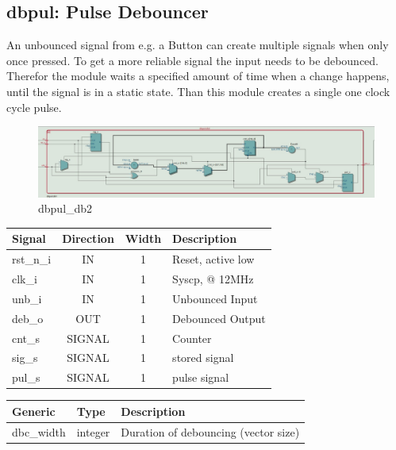 \documentclass[12pt,a4 paper] {report}
\begin{document}
\subsection{dbpul: Pulse Debouncer}
An unbounced signal from e.g. a Button can create multiple signals when only once pressed. To get a more reliable signal 
the input needs to be debounced. Therefor the module waits a specified amount of time when a change happens, until the 
signal is in a static state. Than this module creates a single one clock cycle pulse.
\begin{figure}[h]
	\centering	
	\includegraphics[scale=0.3]{../png/dbpul_db2.png}
	\caption{dbpul\_db2}
\end{figure}
\begin{center}
	\begin{tabular}{ | p{2cm} | c | c | p{5cm} |}
		\hline
		\textbf{Signal} & \textbf{Direction} & \textbf{Width} & \textbf{Description} \\
		\hline
  	rst\_n\_i & IN & 1 &  Reset, active low \\
  	\hline
		clk\_i & IN & 1 & Syscp, @ 12MHz \\
		\hline
		unb\_i & IN & 1 & Unbounced Input \\
		\hline
		deb\_o & OUT & 1 & Debounced Output \\
		\hline
		\hline	
		cnt\_s & SIGNAL & 1 & Counter \\
		\hline
		sig\_s & SIGNAL & 1 & stored signal \\ 
		\hline
		pul\_s & SIGNAL & 1 & pulse signal \\
		\hline
	\end{tabular}
\end{center}
\begin{center}
	\begin{tabular}{| p{2cm} | p{2cm} | p{4cm} |}
	\hline
	\textbf{Generic} & \textbf{Type} & \textbf{Description} \\
	\hline
	dbc\_width & integer & Duration of debouncing (vector size) \\
	\hline
	\end{tabular}
\end{center}

\newpage
\end{document}
